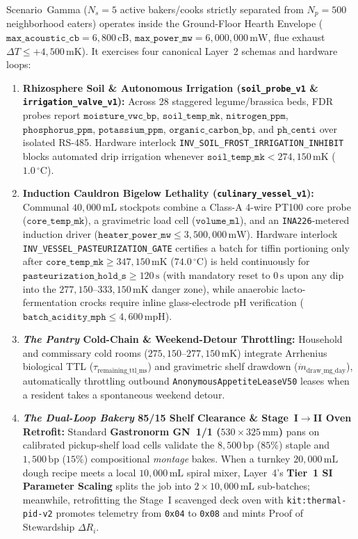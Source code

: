 Scenario~Gamma ($N_s = 5$ active bakers/cooks strictly separated from $N_p = 500$ neighborhood eaters) operates inside the Ground-Floor Hearth Envelope ($\mathtt{max\_acoustic\_cb} = 6{,}800\,\mathrm{cB}$, $\mathtt{max\_power\_mw} = 6{,}000{,}000\,\mathrm{mW}$, flue exhaust $\Delta T \le +4{,}500\,\mathrm{mK}$). It exercises four canonical Layer~2 schemas and hardware loops:
\begin{enumerate}
    \item \textbf{Rhizosphere Soil \& Autonomous Irrigation (\texttt{soil\_probe\_v1} \& \texttt{irrigation\_valve\_v1}):} Across 28 staggered legume/brassica beds, FDR probes report $\mathtt{moisture\_vwc\_bp}$, $\mathtt{soil\_temp\_mk}$, $\mathtt{nitrogen\_ppm}$, $\mathtt{phosphorus\_ppm}$, $\mathtt{potassium\_ppm}$, $\mathtt{organic\_carbon\_bp}$, and $\mathtt{ph\_centi}$ over isolated RS-485. Hardware interlock \texttt{INV\_SOIL\_FROST\_IRRIGATION\_INHIBIT} blocks automated drip irrigation whenever $\mathtt{soil\_temp\_mk} < 274{,}150\,\mathrm{mK}$ ($1.0\,^\circ\mathrm{C}$).
    \item \textbf{Induction Cauldron Bigelow Lethality (\texttt{culinary\_vessel\_v1}):} Communal $40{,}000\,\mathrm{mL}$ stockpots combine a Class-A 4-wire PT100 core probe ($\mathtt{core\_temp\_mk}$), a gravimetric load cell ($\mathtt{volume\_ml}$), and an \texttt{INA226}-metered induction driver ($\mathtt{heater\_power\_mw} \le 3{,}500{,}000\,\mathrm{mW}$). Hardware interlock \texttt{INV\_VESSEL\_PASTEURIZATION\_GATE} certifies a batch for tiffin portioning only after $\mathtt{core\_temp\_mk} \ge 347{,}150\,\mathrm{mK}$ ($74.0\,^\circ\mathrm{C}$) is held continuously for $\mathtt{pasteurization\_hold\_s} \ge 120\,\mathrm{s}$ (with mandatory reset to $0\,\mathrm{s}$ upon any dip into the $277{,}150\text{--}333{,}150\,\mathrm{mK}$ danger zone), while anaerobic lacto-fermentation crocks require inline glass-electrode pH verification ($\mathtt{batch\_acidity\_mph} \le 4{,}600\,\mathrm{mpH}$).
    \item \textbf{\textit{The Pantry} Cold-Chain \& Weekend-Detour Throttling:} Household and commissary cold rooms ($275{,}150\text{--}277{,}150\,\mathrm{mK}$) integrate Arrhenius biological TTL ($\tau_{\mathrm{remaining\_ttl\_ms}}$) and gravimetric shelf drawdown ($\dot{m}_{\mathrm{draw\_mg\_day}}$), automatically throttling outbound \texttt{AnonymousAppetiteLeaseV50} leases when a resident takes a spontaneous weekend detour.
    \item \textbf{\textit{The Dual-Loop Bakery} 85/15 Shelf Clearance \& Stage~I$\to$II Oven Retrofit:} Standard \textbf{Gastronorm GN~1/1 ($530 \times 325\,\mathrm{mm}$)} pans on calibrated pickup-shelf load cells validate the $8{,}500\,\mathrm{bp}$ ($85\%$) staple and $1{,}500\,\mathrm{bp}$ ($15\%$) compositional \textit{montage} bakes. When a turnkey $20{,}000\,\mathrm{mL}$ dough recipe meets a local $10{,}000\,\mathrm{mL}$ spiral mixer, Layer~4's \textbf{Tier~1 SI Parameter Scaling} splits the job into $2 \times 10{,}000\,\mathrm{mL}$ sub-batches; meanwhile, retrofitting the Stage~I scavenged deck oven with \texttt{kit:thermal-pid-v2} promotes telemetry from \texttt{0x04} to \texttt{0x08} and mints Proof of Stewardship $\Delta R_i$.
\end{enumerate}

